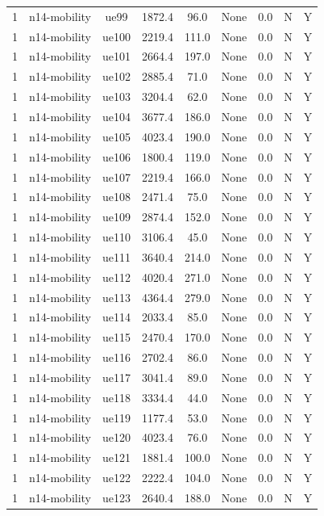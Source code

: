 \begin{table}[ht]
\begin{tabular}{|c|c|c|c|c|c|c|c|c|}
1 & n14-mobility & ue99 & 1872.4 & 96.0 & None & 0.0 & N & Y \\
1 & n14-mobility & ue100 & 2219.4 & 111.0 & None & 0.0 & N & Y \\
1 & n14-mobility & ue101 & 2664.4 & 197.0 & None & 0.0 & N & Y \\
1 & n14-mobility & ue102 & 2885.4 & 71.0 & None & 0.0 & N & Y \\
1 & n14-mobility & ue103 & 3204.4 & 62.0 & None & 0.0 & N & Y \\
1 & n14-mobility & ue104 & 3677.4 & 186.0 & None & 0.0 & N & Y \\
1 & n14-mobility & ue105 & 4023.4 & 190.0 & None & 0.0 & N & Y \\
1 & n14-mobility & ue106 & 1800.4 & 119.0 & None & 0.0 & N & Y \\
1 & n14-mobility & ue107 & 2219.4 & 166.0 & None & 0.0 & N & Y \\
1 & n14-mobility & ue108 & 2471.4 & 75.0 & None & 0.0 & N & Y \\
1 & n14-mobility & ue109 & 2874.4 & 152.0 & None & 0.0 & N & Y \\
1 & n14-mobility & ue110 & 3106.4 & 45.0 & None & 0.0 & N & Y \\
1 & n14-mobility & ue111 & 3640.4 & 214.0 & None & 0.0 & N & Y \\
1 & n14-mobility & ue112 & 4020.4 & 271.0 & None & 0.0 & N & Y \\
1 & n14-mobility & ue113 & 4364.4 & 279.0 & None & 0.0 & N & Y \\
1 & n14-mobility & ue114 & 2033.4 & 85.0 & None & 0.0 & N & Y \\
1 & n14-mobility & ue115 & 2470.4 & 170.0 & None & 0.0 & N & Y \\
1 & n14-mobility & ue116 & 2702.4 & 86.0 & None & 0.0 & N & Y \\
1 & n14-mobility & ue117 & 3041.4 & 89.0 & None & 0.0 & N & Y \\
1 & n14-mobility & ue118 & 3334.4 & 44.0 & None & 0.0 & N & Y \\
1 & n14-mobility & ue119 & 1177.4 & 53.0 & None & 0.0 & N & Y \\
1 & n14-mobility & ue120 & 4023.4 & 76.0 & None & 0.0 & N & Y \\
1 & n14-mobility & ue121 & 1881.4 & 100.0 & None & 0.0 & N & Y \\
1 & n14-mobility & ue122 & 2222.4 & 104.0 & None & 0.0 & N & Y \\
1 & n14-mobility & ue123 & 2640.4 & 188.0 & None & 0.0 & N & Y \\

\end{tabular}
\end{table}
